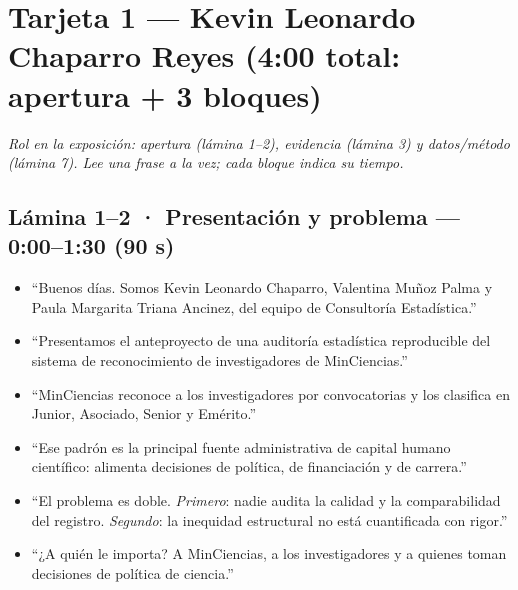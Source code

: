 \documentclass[10pt,a4paper]{article}
\begin{document}
\section{Tarjeta 1 — Kevin Leonardo Chaparro Reyes \quad (4:00 total: apertura + 3 bloques)}

\textit{Rol en la exposición: apertura (lámina 1--2), evidencia (lámina 3) y
datos/método (lámina 7). Lee una frase a la vez; cada bloque indica su tiempo.}

\subsection{Lámina 1--2 · Presentación y problema — 0:00--1:30 (90 s)}
\begin{itemize}
  \item ``Buenos días. Somos Kevin Leonardo Chaparro, Valentina Muñoz Palma y
        Paula Margarita Triana Ancinez, del equipo de Consultoría Estadística.''
  \item ``Presentamos el anteproyecto de una auditoría estadística reproducible
        del sistema de reconocimiento de investigadores de MinCiencias.''
  \item ``MinCiencias reconoce a los investigadores por convocatorias y los
        clasifica en Junior, Asociado, Senior y Emérito.''
  \item ``Ese padrón es la principal fuente administrativa de capital humano
        científico: alimenta decisiones de política, de financiación y de
        carrera.''
  \item ``El problema es doble. \emph{Primero}: nadie audita la calidad y la
        comparabilidad del registro. \emph{Segundo}: la inequidad estructural
        no está cuantificada con rigor.''
  \item ``¿A quién le importa? A MinCiencias, a los investigadores y a quienes
        toman decisiones de política de ciencia.''
\end{itemize}
\end{document}
